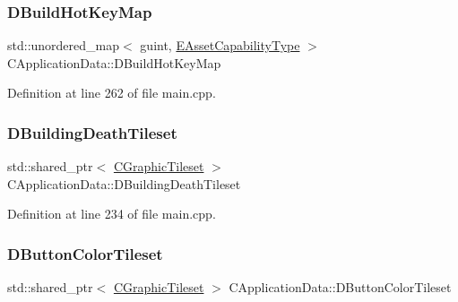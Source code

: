 \subsubsection{\texorpdfstring{D\+Build\+Hot\+Key\+Map}{DBuildHotKeyMap}}
{\footnotesize\ttfamily std\+::unordered\+\_\+map$<$ guint, \hyperlink{GameDataTypes_8h_a35b98ce26aca678b03c6f9f76e4778ce}{E\+Asset\+Capability\+Type} $>$ C\+Application\+Data\+::\+D\+Build\+Hot\+Key\+Map\hspace{0.3cm}{\ttfamily [protected]}}



Definition at line 262 of file main.\+cpp.

\hypertarget{classCApplicationData_ab463f816076fec8d43ecfe61120e8e6b}{}\label{classCApplicationData_ab463f816076fec8d43ecfe61120e8e6b} 
\subsubsection{\texorpdfstring{D\+Building\+Death\+Tileset}{DBuildingDeathTileset}}
{\footnotesize\ttfamily std\+::shared\+\_\+ptr$<$ \hyperlink{classCGraphicTileset}{C\+Graphic\+Tileset} $>$ C\+Application\+Data\+::\+D\+Building\+Death\+Tileset\hspace{0.3cm}{\ttfamily [protected]}}



Definition at line 234 of file main.\+cpp.

\hypertarget{classCApplicationData_a7482e0b4d7e0ce4979eb9f28872023ad}{}\label{classCApplicationData_a7482e0b4d7e0ce4979eb9f28872023ad} 
\subsubsection{\texorpdfstring{D\+Button\+Color\+Tileset}{DButtonColorTileset}}
{\footnotesize\ttfamily std\+::shared\+\_\+ptr$<$ \hyperlink{classCGraphicTileset}{C\+Graphic\+Tileset} $>$ C\+Application\+Data\+::\+D\+Button\+Color\+Tileset\hspace{0.3cm}{\ttfamily [protected]}}



